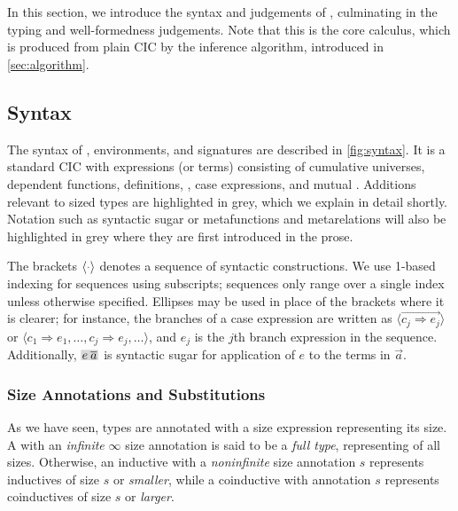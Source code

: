 \section{\titlelang}\label{sec:typing}
In this section, we introduce the syntax and judgements of \lang,
culminating in the typing and well-formedness judgements.
Note that this is the core calculus, which is produced from plain CIC by the inference algorithm,
introduced in \autoref{sec:algorithm}.

\subsection{Syntax}



The syntax of \lang, environments, and signatures are described in \autoref{fig:syntax}.
It is a standard CIC with expressions (or terms) consisting of cumulative universes, dependent functions, definitions, \coinductives, case expressions, and mutual \cofixpoints.
Additions relevant to sized types are highlighted in grey,
which we explain in detail shortly.
Notation such as syntactic sugar or metafunctions and metarelations will also be highlighted in grey
where they are first introduced in the prose.

The brackets $\seq{\ph}$ denotes a sequence of syntactic constructions.
We use 1-based indexing for sequences using subscripts;
sequences only range over a single index unless otherwise specified.
Ellipses may be used in place of the brackets where it is clearer;
for instance, the branches of a case expression are written as
$\langle \vec{c_j \Rightarrow e_j} \rangle$ or
$\langle c_1 \Rightarrow e_1, \dots, c_j \Rightarrow e_j, \dots \rangle$,
and $e_j$ is the $j$th branch expression in the sequence.
Additionally, $\new{\app{e}{\vec{a}}}$ is syntactic sugar for application of $e$ to the terms in $\vec{a}$.

\subsubsection{Size Annotations and Substitutions}

As we have seen, \coinductive types are annotated with a size expression representing its size.
A \coinductive with an \textit{infinite} $\infty$ size annotation is said to be a \textit{full type},
representing \coinductives of all sizes.
Otherwise, an inductive with a \textit{noninfinite} size annotation $s$ represents inductives of size $s$ or \emph{smaller},
while a coinductive with annotation $s$ represents coinductives of size $s$ or \emph{larger}.

